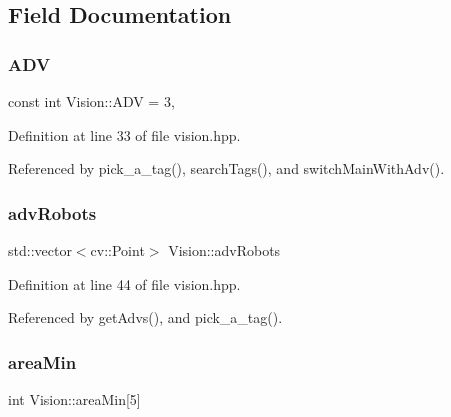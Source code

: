 \subsection{Field Documentation}
\mbox{\label{class_vision_ac1903844090d6721f5c854621c516d8f}} 
\subsubsection{\texorpdfstring{A\+DV}{ADV}}
{\footnotesize\ttfamily const int Vision\+::\+A\+DV = 3\hspace{0.3cm}{\ttfamily [static]}, {\ttfamily [private]}}



Definition at line 33 of file vision.\+hpp.



Referenced by pick\+\_\+a\+\_\+tag(), search\+Tags(), and switch\+Main\+With\+Adv().

\mbox{\label{class_vision_ac6fb7fc6bde1436ef63c255858d690a4}} 
\subsubsection{\texorpdfstring{adv\+Robots}{advRobots}}
{\footnotesize\ttfamily std\+::vector$<$cv\+::\+Point$>$ Vision\+::adv\+Robots\hspace{0.3cm}{\ttfamily [private]}}



Definition at line 44 of file vision.\+hpp.



Referenced by get\+Advs(), and pick\+\_\+a\+\_\+tag().

\mbox{\label{class_vision_a674b5bf7f6570f5b8e053ee28a9721ff}} 
\subsubsection{\texorpdfstring{area\+Min}{areaMin}}
{\footnotesize\ttfamily int Vision\+::area\+Min\mbox{[}5\mbox{]}\hspace{0.3cm}{\ttfamily [private]}}



